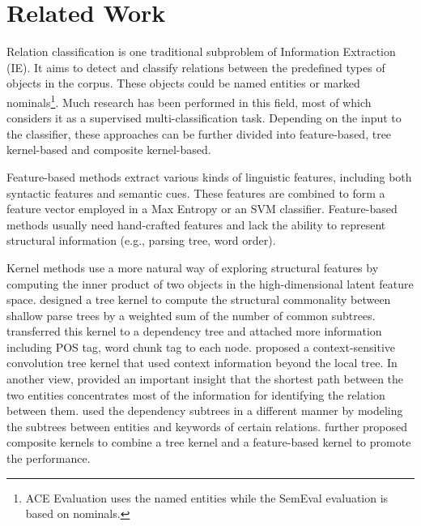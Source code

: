 \documentclass[11pt]{article}
\begin{document}
 \setcounter{footnote}{2}
\section{Related Work}
Relation classification is  one traditional subproblem of Information Extraction (IE). It aims to detect and classify relations between the predefined types of objects in the corpus. These objects could be named entities or marked nominals\footnote{ACE Evaluation uses the named entities while the SemEval evaluation is based on nominals.}. Much research has been performed in this field, most of which considers it as a supervised multi-classification task. Depending on the input to the classifier, these approaches can be further divided into feature-based, tree kernel-based and composite kernel-based.

Feature-based methods extract various kinds of linguistic features, including both syntactic features and semantic cues. These features are combined to form a feature vector employed in a Max Entropy \cite{5219721} or an SVM \cite{2415182,guodong2005exploring} classifier. Feature-based methods usually need hand-crafted features and lack the ability to represent structural information (e.g., parsing tree, word order).

Kernel methods use a more natural way of exploring structural features by computing the inner product of two objects in the high-dimensional latent feature space.  designed a tree kernel to compute the structural commonality between shallow parse trees by a weighted sum of the number of common subtrees.  transferred this kernel to a dependency tree and attached more information including POS tag, word chunk tag to each node.  proposed a context-sensitive convolution tree kernel that used context information beyond the local tree.
In another view,  provided an important insight that the shortest path between the two entities concentrates most of the information for identifying the relation between them.  used the dependency subtrees in a different manner by modeling the subtrees between entities and keywords of certain relations.
 further proposed composite kernels to combine a tree kernel and a feature-based kernel to promote the performance.
\end{document}
